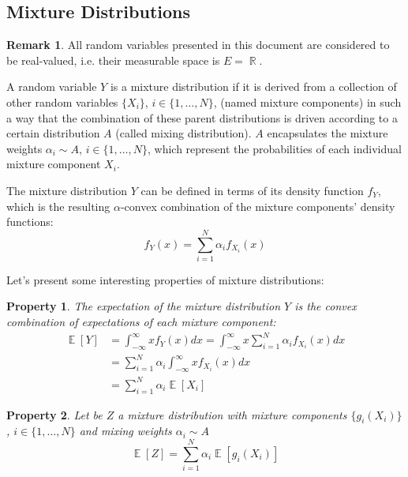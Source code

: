 \documentclass[12pt,a4paper,openright,twoside]{article}
\DeclareMathOperator*{\E}{\mathbb{E}}
\DeclareMathOperator*{\R}{\mathbb{R}}
\numberwithin{equation}{section}
\theoremstyle{definition}
\newtheorem*{remark}{Remark}
\theoremstyle{remark}
\theoremstyle{plain}
\newtheorem{mixtureProperty}{Property}
\begin{document}
\subsection{Mixture Distributions}

\begin{remark}
All random variables presented in this document are considered to be real-valued, i.e. their measurable space is $E= \R$. 
\end{remark}

A random variable $Y$ is a mixture distribution if it is derived from a collection of other random variables $\{X_i\}$, $i\in \{1, \dots, N\}$, (named mixture components) in such a way that the combination of these parent distributions is driven according to a certain distribution $A$ (called mixing distribution). $A$ encapsulates the mixture weights $\alpha_i \sim A$, $i\in \{1, \dots, N\}$, which represent the probabilities of each individual mixture component $X_i$. 

The mixture distribution $Y$ can be defined in terms of its density function $f_Y$, which is the resulting $\alpha$-convex combination of the mixture components' density functions:
\begin{equation} \label{mixtureDef}
    f_{Y} (x) = \sum_{i=1}^{N} \alpha _i f_{X_i}(x)
\end{equation}

Let's present some interesting properties of mixture distributions:

\begin{mixtureProperty} \label{mixtureProperty1}
	The expectation of the mixture distribution $Y$ is the convex combination of expectations of each mixture component: 
    \begin{equation} \label{mixtureProperty1eq}
    \begin{split}
        \E [Y] &= \int_{-\infty}^{\infty} x f_{Y}(x) dx = \int_{-\infty}^{\infty} x \sum_{i=1}^{N} \alpha_i f_{X_i}(x) dx \\
        &= \sum_{i=1}^{N} \alpha_i \int_{-\infty}^{\infty} x f_{X_i}(x) dx \\
        &= \sum_{i=1}^{N} \alpha_i \E [X_i]
    \end{split}
    \end{equation}
\end{mixtureProperty}


\begin{mixtureProperty} \label{mixtureProperty2}
	Let be $Z$ a mixture distribution with mixture components $\{g_i(X_i)\}$, $i\in \{1, \dots, N\}$ and mixing weights $\alpha_i \sim A$
    \begin{equation} \label{mixtureProperty2eq}
        \E [Z] = \sum_{i=1}^{N} \alpha_i \E [g_i(X_i)]
    \end{equation}
\end{mixtureProperty}
\end{document}
